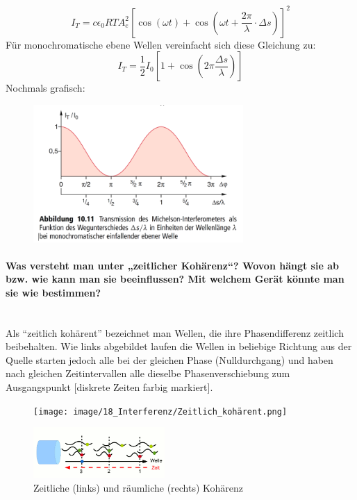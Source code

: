 \documentclass[a4paper, 11pt, ngerman, parskip=half-]{scrartcl}
\newcommand{\myparagraph}[1]{\paragraph{#1}\mbox{}\\}
\begin{document}
\begin{equation}
    I_T = c \epsilon_0 RT A_e^2 \left[ \cos(\omega t) + \cos(\omega t + \frac{2\pi}{\lambda} \cdot \Delta s) \right]^2
\end{equation}
%
Für monochromatische ebene Wellen vereinfacht sich diese Gleichung zu:
%
\begin{equation}
    I_T = \frac{1}{2} I_0 \left[ 1 + \cos(2\pi \frac{\Delta s}{\lambda}) \right]
\end{equation}
%
Nochmals grafisch:
\begin{figure}[H]
    \centering
    \includegraphics[width=8cm]{image/18_Interferenz/Michelson_Funktion_Wegunterschied.png}
\end{figure}

\myparagraph{Was versteht man unter „zeitlicher Kohärenz“? Wovon hängt sie ab bzw. wie kann man sie
    beeinflussen? Mit welchem Gerät könnte man sie wie bestimmen?}

Als \enquote{zeitlich kohärent} bezeichnet man Wellen, die ihre Phasendifferenz zeitlich beibehalten. Wie links abgebildet laufen die Wellen in beliebige Richtung aus der Quelle
starten jedoch alle bei der gleichen Phase (Nulldurchgang) und haben nach gleichen Zeitintervallen alle dieselbe Phasenverschiebung zum Ausgangspunkt [diskrete Zeiten farbig markiert].
\begin{figure}[H]
    \centering
    \begin{minipage}[b]{0.3\textwidth}
        \centering
        \texttt{[image: image/18\_Interferenz/Zeitlich\_kohärent.png]}
    \end{minipage}
    \hspace{2cm}
    \begin{minipage}[b]{0.3\textwidth}
        \centering
        \includegraphics[width=5cm]{image/18_Interferenz/räumliche_kohärenz.png}
    \end{minipage}
    \caption{Zeitliche (links) und räumliche (rechts) Kohärenz}
    \label{fig:kohaerenz}
\end{figure}
\end{document}
